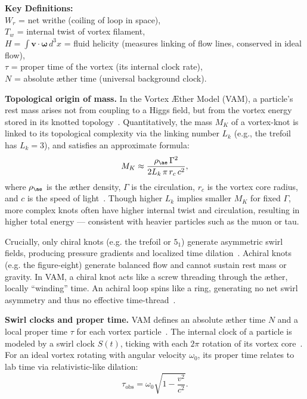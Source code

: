 \textbf{Key Definitions:} \\
$W_r$ = net writhe (coiling of loop in space),\\
$T_w$ = internal twist of vortex filament,\\
$H = \int \mathbf{v}\cdot\boldsymbol{\omega}\,d^3x$ = fluid helicity (measures linking of flow lines, conserved in ideal flow),\\
$\tau$ = proper time of the vortex (its internal clock rate),\\
$N$ = absolute æther time (universal background clock).

\textbf{Topological origin of mass.} In the Vortex Æther Model (VAM), a particle’s rest mass arises not from coupling to a Higgs field, but from the vortex energy stored in its knotted topology~\cite{iskandarani2025vam5}. Quantitatively, the mass $M_K$ of a vortex-knot is linked to its topological complexity via the linking number $L_k$ (e.g., the trefoil has $L_k = 3$), and satisfies an approximate formula:
\[
M_K \approx \frac{\rho_{\ae}\, \Gamma^2}{2 L_k\, \pi\, r_c\, c^2},
\]
where $\rho_{\ae}$ is the æther density, $\Gamma$ is the circulation, $r_c$ is the vortex core radius, and $c$ is the speed of light~\cite{iskandarani2025vam5}. Though higher $L_k$ implies smaller $M_K$ for fixed $\Gamma$, more complex knots often have higher internal twist and circulation, resulting in higher total energy — consistent with heavier particles such as the muon or tau.

Crucially, only chiral knots (e.g. the trefoil or $5_1$) generate asymmetric swirl fields, producing pressure gradients and localized time dilation~\cite{iskandarani2025vam5}. Achiral knots (e.g. the figure-eight) generate balanced flow and cannot sustain rest mass or gravity. In VAM, a chiral knot acts like a screw threading through the æther, locally “winding” time. An achiral loop spins like a ring, generating no net swirl asymmetry and thus no effective time-thread~\cite{iskandarani2025vam5}.

\textbf{Swirl clocks and proper time.} VAM defines an absolute æther time $N$ and a local proper time $\tau$ for each vortex particle~\cite{iskandarani2025vam1}. The internal clock of a particle is modeled by a swirl clock $S(t)$, ticking with each $2\pi$ rotation of its vortex core~\cite{iskandarani2025vam1}. For an ideal vortex rotating with angular velocity $\omega_0$, its proper time relates to lab time via relativistic-like dilation:
\[
\tau_{\text{obs}} = \omega_0 \sqrt{1 - \frac{v^2}{c^2}}.
\]

